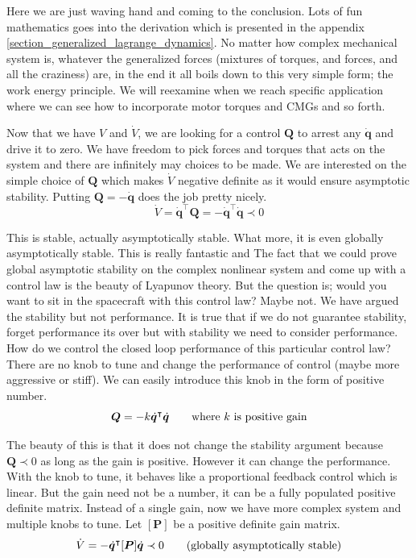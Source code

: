 \documentclass{article}
\begin{document}
Here we are just waving hand and coming to the conclusion. Lots of fun mathematics goes into the derivation which is presented in the appendix \ref{section_generalized_lagrange_dynamics}. No matter how complex mechanical system is, whatever the generalized forces (mixtures of torques, and forces, and all the craziness) are, in the end it all boils down to this very simple form; the work energy principle. We will reexamine when we reach specific application where we can see how to incorporate motor torques and CMGs and so forth.

Now that we have $V$ and $\dot{V}$, we are looking for a control $\bm{Q}$ to arrest any $\dot{\bm{q}}$ and drive it to zero. We have freedom to pick forces and torques that acts on the system and there are infinitely may choices to be made. We are interested on the simple choice of $\bm{Q}$ which makes $\dot{V}$ negative definite as it would ensure asymptotic stability. Putting $\bm{Q}=-\dot{\bm{q}}$ does the job pretty nicely.
$$
\dot{V}=\dot{\bm{q}}^{\intercal}\bm{Q}=-\dot{\bm{q}}^{\intercal}\dot{\bm{q}}\prec0
$$

This is stable, actually asymptotically stable. What more, it is even globally asymptotically stable. This is really fantastic and The fact that we could prove global asymptotic stability on the complex nonlinear system and come up with a control law is the beauty of Lyapunov theory. But the question is; would you want to sit in the spacecraft with this control law? Maybe not. We have argued the stability but not performance. It is true that if we do not guarantee stability, forget performance its over but with stability we need to consider performance. How do we control the closed loop performance of this particular control law? There are no knob to tune and change the performance of control (maybe more aggressive or stiff). We can easily introduce this knob in the form of positive number.
$$
\bm{Q}=-k\dot{\bm{q}}^{\intercal}\dot{\bm{q}}\quad\quad\textnormal{where $k$ is positive gain}
$$

The beauty of this is that it does not change the stability argument because $\bm{Q}\prec0$ as long as the gain is positive. However it can change the performance. With the knob to tune, it behaves like a proportional feedback control which is linear. But the gain need not be a number, it can be a fully populated positive definite matrix. Instead of a single gain, now we have more complex system and multiple knobs to tune. Let $[\bm{P}]$ be a positive definite gain matrix.
$$
\dot{V}=-\dot{\bm{q}}^{\intercal}[\bm{P}]\dot{\bm{q}}\prec0\quad\quad\textnormal{(globally asymptotically stable)}
$$
\end{document}
